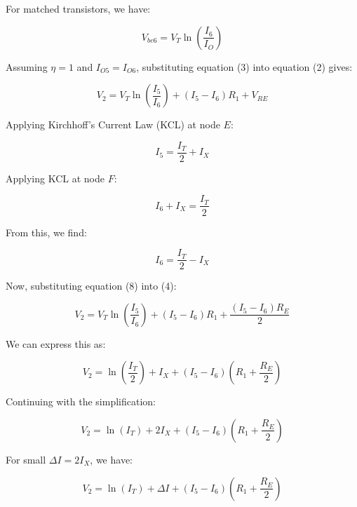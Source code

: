 \documentclass[a4paper,9pt,twoside,openany,twocolumn]{memoir}
\begin{document}
For matched transistors, we have:

\begin{equation}
V_{be6} = V_T \ln \left( \frac{I_6}{I_O} \right) \tag{3}
\end{equation}

Assuming \(\eta = 1\) and \(I_{O5} = I_{O6}\), substituting equation (3) into equation (2) gives:

\begin{equation}
V_2 = V_T \ln \left( \frac{I_5}{I_6} \right) + (I_5 - I_6) R_1 + V_{RE} \tag{4}
\end{equation}

Applying Kirchhoff's Current Law (KCL) at node \(E\):

\begin{equation}
I_5 = \frac{I_T}{2} + I_X \tag{5}
\end{equation}

Applying KCL at node \(F\):

\begin{equation}
I_6 + I_X = \frac{I_T}{2} \tag{6}
\end{equation}

From this, we find:

\begin{equation}
I_6 = \frac{I_T}{2} - I_X \tag{7}
\end{equation}

Now, substituting equation (8) into (4):

\begin{equation}
V_2 = V_T \ln \left( \frac{I_5}{I_6} \right) + (I_5 - I_6) R_1 + \frac{(I_5 - I_6) R_E}{2} \tag{9}
\end{equation}

We can express this as:

\begin{equation}
V_2 = \ln \left( \frac{I_T}{2} \right) + I_X + (I_5 - I_6) \left( R_1 + \frac{R_E}{2} \right) \tag{10}
\end{equation}

Continuing with the simplification:

\begin{equation}
V_2 = \ln(I_T) + 2I_X + (I_5 - I_6) \left( R_1 + \frac{R_E}{2} \right) \tag{11}
\end{equation}

For small \(\Delta I = 2I_X\), we have:

\begin{equation}
V_2 = \ln(I_T) + \Delta I + (I_5 - I_6) \left( R_1 + \frac{R_E}{2} \right) \tag{12}
\end{equation}
\end{document}
